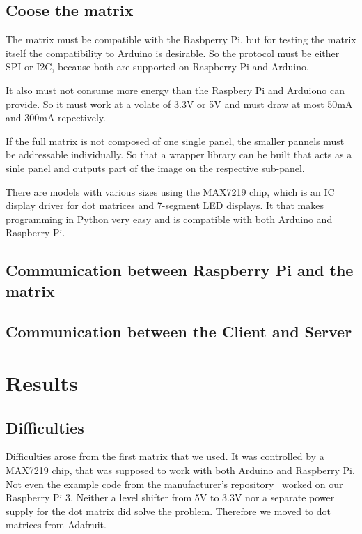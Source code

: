 \documentclass[conference]{IEEEtran}
\begin{document}
\subsection{Coose the matrix}
The matrix must be compatible with the Rasbperry Pi, but for testing the matrix itself the compatibility to Arduino is desirable. So the protocol must be either SPI or I2C, because both are supported on Raspberry Pi and Arduino.

It also must not consume more energy than the Raspbery Pi and Arduiono can provide. So it must work at a volate of 3.3V or 5V and must draw at most 50mA and 300mA repectively\cite{rpiperipherals}.

If the full matrix is not composed of one single panel, the smaller pannels must be addressable individually. So that a wrapper library can be built that acts as a sinle panel and outputs part of the image on the respective sub-panel.

There are models with various sizes using the MAX7219 chip, which is an IC display driver for dot matrices and 7-segment LED displays. It that makes programming in Python very easy and is compatible with both Arduino and Raspberry Pi.


\subsection{Communication between Raspberry Pi and the matrix}

\subsection{Communication between the Client and Server}


\section{Results}

\subsection{Difficulties}
Difficulties arose from the first matrix that we used. It was controlled by a MAX7219 chip, that was supposed to work with both Arduino and Raspberry Pi. Not even the example code from the manufacturer's repository~\cite{azdelivery464} worked on our Raspberry Pi 3. Neither a level shifter from 5V to 3.3V nor a separate power supply for the dot matrix did solve the problem. Therefore we moved to dot matrices from Adafruit\cite{adafruit88}.
\end{document}
